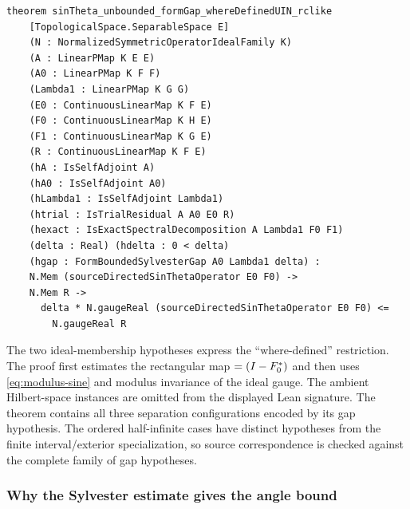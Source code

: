 \documentclass[11pt]{article}
\begin{document}
\begin{lstlisting}[style=leanpaper,
  caption={Lean signature for the sine-theta estimate. The surrounding
  scalar-field and Hilbert-space context is omitted. The positive
  trial-coordinate sine is \texttt{sourceDirectedSinThetaOperator E0 F0};
  \texttt{FormBoundedSylvesterGap} encodes the interval/exterior and ordered
  half-infinite separation hypotheses described above.},
  label={lst:dk-sintheta-headline}]
theorem sinTheta_unbounded_formGap_whereDefinedUIN_rclike
    [TopologicalSpace.SeparableSpace E]
    (N : NormalizedSymmetricOperatorIdealFamily K)
    (A : LinearPMap K E E)
    (A0 : LinearPMap K F F)
    (Lambda1 : LinearPMap K G G)
    (E0 : ContinuousLinearMap K F E)
    (F0 : ContinuousLinearMap K H E)
    (F1 : ContinuousLinearMap K G E)
    (R : ContinuousLinearMap K F E)
    (hA : IsSelfAdjoint A)
    (hA0 : IsSelfAdjoint A0)
    (hLambda1 : IsSelfAdjoint Lambda1)
    (htrial : IsTrialResidual A A0 E0 R)
    (hexact : IsExactSpectralDecomposition A Lambda1 F0 F1)
    (delta : Real) (hdelta : 0 < delta)
    (hgap : FormBoundedSylvesterGap A0 Lambda1 delta) :
    N.Mem (sourceDirectedSinThetaOperator E0 F0) ->
    N.Mem R ->
      delta * N.gaugeReal (sourceDirectedSinThetaOperator E0 F0) <=
        N.gaugeReal R
\end{lstlisting}

The two ideal-membership hypotheses express the ``where-defined'' restriction.
The proof first estimates the rectangular map $\sym{S}=(I-\sym{F0}\like{F0}{F_0^*})\sym{E0}$ and then
uses \cref{eq:modulus-sine} and modulus invariance of the ideal gauge. The
ambient Hilbert-space instances are omitted from the displayed Lean signature.
The theorem contains all three separation configurations encoded by its gap
hypothesis.  The ordered half-infinite cases have distinct hypotheses from
the finite interval/exterior specialization, so source correspondence is checked
against the complete family of gap hypotheses.

\subsubsection{Why the Sylvester estimate gives the angle bound}
\end{document}
